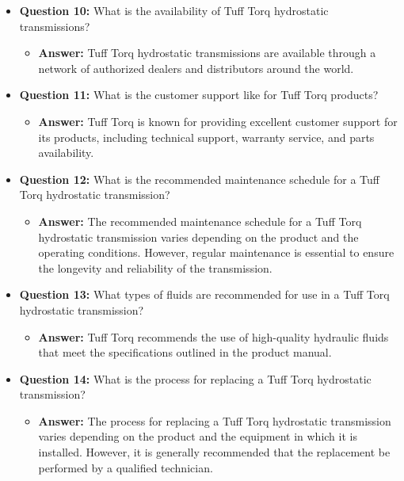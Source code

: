 \documentclass{article}
\begin{document}
\begin{itemize}
    \item \textbf{Question 10:} What is the availability of Tuff Torq hydrostatic transmissions?
    \begin{itemize}
        \item \textbf{Answer:} Tuff Torq hydrostatic transmissions are available through a network of authorized dealers and distributors around the world.
    \end{itemize}
    
    \item \textbf{Question 11:} What is the customer support like for Tuff Torq products?
    \begin{itemize}
        \item \textbf{Answer:} Tuff Torq is known for providing excellent customer support for its products, including technical support, warranty service, and parts availability.
    \end{itemize}
    
    \item \textbf{Question 12:} What is the recommended maintenance schedule for a Tuff Torq hydrostatic transmission?
    \begin{itemize}
        \item \textbf{Answer:} The recommended maintenance schedule for a Tuff Torq hydrostatic transmission varies depending on the product and the operating conditions. However, regular maintenance is essential to ensure the longevity and reliability of the transmission.
    \end{itemize}
    
    \item \textbf{Question 13:} What types of fluids are recommended for use in a Tuff Torq hydrostatic transmission?
    \begin{itemize}
        \item \textbf{Answer:} Tuff Torq recommends the use of high-quality hydraulic fluids that meet the specifications outlined in the product manual.
    \end{itemize}
    
    \item \textbf{Question 14:} What is the process for replacing a Tuff Torq hydrostatic transmission?
    \begin{itemize}
        \item \textbf{Answer:} The process for replacing a Tuff Torq hydrostatic transmission varies depending on the product and the equipment in which it is installed. However, it is generally recommended that the replacement be performed by a qualified technician.
    \end{itemize}
    

\end{itemize}
\end{document}
